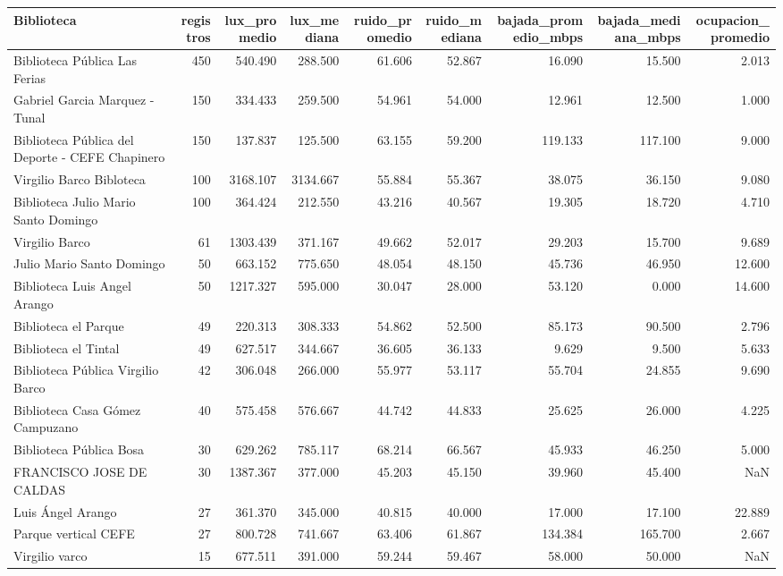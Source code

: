 \begin{tabular}{lrrrrrrrr}
\toprule
Biblioteca & registros & lux\_promedio & lux\_mediana & ruido\_promedio & ruido\_mediana & bajada\_promedio\_mbps & bajada\_mediana\_mbps & ocupacion\_promedio \\
\midrule
Biblioteca Pública Las Ferias & 450 & 540.490 & 288.500 & 61.606 & 52.867 & 16.090 & 15.500 & 2.013 \\
Gabriel Garcia Marquez - Tunal & 150 & 334.433 & 259.500 & 54.961 & 54.000 & 12.961 & 12.500 & 1.000 \\
Biblioteca Pública del Deporte - CEFE Chapinero & 150 & 137.837 & 125.500 & 63.155 & 59.200 & 119.133 & 117.100 & 9.000 \\
Virgilio Barco Bibloteca & 100 & 3168.107 & 3134.667 & 55.884 & 55.367 & 38.075 & 36.150 & 9.080 \\
Biblioteca Julio Mario Santo Domingo & 100 & 364.424 & 212.550 & 43.216 & 40.567 & 19.305 & 18.720 & 4.710 \\
Virgilio Barco & 61 & 1303.439 & 371.167 & 49.662 & 52.017 & 29.203 & 15.700 & 9.689 \\
Julio Mario Santo Domingo & 50 & 663.152 & 775.650 & 48.054 & 48.150 & 45.736 & 46.950 & 12.600 \\
Biblioteca Luis Angel Arango & 50 & 1217.327 & 595.000 & 30.047 & 28.000 & 53.120 & 0.000 & 14.600 \\
Biblioteca el Parque & 49 & 220.313 & 308.333 & 54.862 & 52.500 & 85.173 & 90.500 & 2.796 \\
Biblioteca el Tintal & 49 & 627.517 & 344.667 & 36.605 & 36.133 & 9.629 & 9.500 & 5.633 \\
Biblioteca Pública Virgilio Barco & 42 & 306.048 & 266.000 & 55.977 & 53.117 & 55.704 & 24.855 & 9.690 \\
Biblioteca Casa Gómez Campuzano & 40 & 575.458 & 576.667 & 44.742 & 44.833 & 25.625 & 26.000 & 4.225 \\
Biblioteca Pública Bosa & 30 & 629.262 & 785.117 & 68.214 & 66.567 & 45.933 & 46.250 & 5.000 \\
FRANCISCO JOSE DE CALDAS & 30 & 1387.367 & 377.000 & 45.203 & 45.150 & 39.960 & 45.400 & NaN \\
Luis Ángel Arango & 27 & 361.370 & 345.000 & 40.815 & 40.000 & 17.000 & 17.100 & 22.889 \\
Parque vertical CEFE & 27 & 800.728 & 741.667 & 63.406 & 61.867 & 134.384 & 165.700 & 2.667 \\
Virgilio varco & 15 & 677.511 & 391.000 & 59.244 & 59.467 & 58.000 & 50.000 & NaN \\
\bottomrule
\end{tabular}
